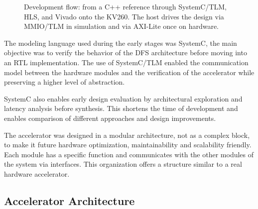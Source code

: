 \documentclass[conference]{IEEEtran}
\begin{document}
\begin{figure}[h]
\centering


\caption{Development flow: from a C++ reference through SystemC/TLM, HLS, and Vivado onto the KV260. The host drives the design via MMIO/TLM in simulation and via AXI-Lite once on hardware.}
\label{fig:development_flow}

\end{figure}

The modeling language used during the early stages was SystemC, the main objective was to verify the behavior of the DFS architecture before moving into an RTL implementation. The use of SystemC/TLM enabled the communication model between the hardware modules and the verification of the accelerator while preserving a higher level of abstraction.

SystemC also enables early design evaluation by architectural exploration and latency analysis before synthesis. This shortens the time of development and enables comparison of different approaches and design improvements.

The accelerator was designed in a modular architecture, not as a complex block, to make it future hardware optimization, maintainability and scalability friendly. Each module has a specific function and communicates with the other modules of the system via interfaces. This organization offers a structure similar to a real hardware accelerator.

\subsection{Accelerator Architecture}
\end{document}
